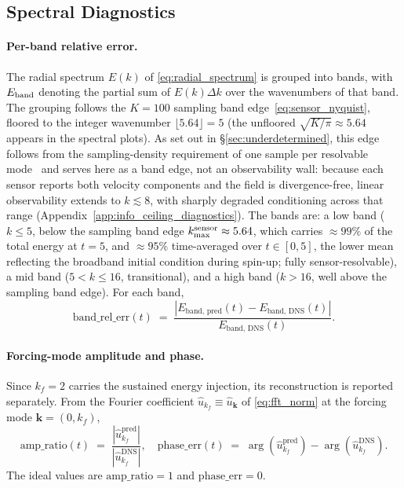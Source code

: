\subsection{Spectral Diagnostics}
\label{subsec:spectral_diagnostics}

\paragraph{Per-band relative error.}
The radial spectrum $E(k)$ of \eqref{eq:radial_spectrum} is grouped into bands, with $E_{\rm band}$ denoting the partial sum of $E(k)\Delta k$ over the wavenumbers of that band. The grouping follows the $K=100$ sampling band edge~\eqref{eq:sensor_nyquist}, floored to the integer wavenumber $\lfloor 5.64 \rfloor = 5$ (the unfloored $\sqrt{K/\pi}\approx 5.64$ appears in the spectral plots). As set out in \S\ref{sec:underdetermined}, this edge follows from the sampling-density requirement of one sample per resolvable mode~\cite{Shannon1949, Landau1967} and serves here as a band edge, not an observability wall: because each sensor reports both velocity components and the field is divergence-free, linear observability extends to $k\lesssim 8$, with sharply degraded conditioning across that range (Appendix~\ref{app:info_ceiling_diagnostics}). The bands are: a low band ($k \le 5$, below the sampling band edge $k_{\max}^{\rm sensor}\approx 5.64$, which carries $\approx 99\%$ of the total energy at $t=5$, and $\approx 95\%$ time-averaged over $t\in[0,5]$, the lower mean reflecting the broadband initial condition during spin-up; fully sensor-resolvable), a mid band ($5 < k \le 16$, transitional), and a high band ($k > 16$, well above the sampling band edge). For each band,
\begin{equation}
    \mathrm{band\_rel\_err}(t) \;=\; \frac{|E_{\text{band, pred}}(t) - E_{\text{band, DNS}}(t)|}{E_{\text{band, DNS}}(t)}.
\end{equation}

\paragraph{Forcing-mode amplitude and phase.}
Since $k_f = 2$ carries the sustained energy injection, its reconstruction is reported separately. From the Fourier coefficient $\hat{u}_{k_f} \equiv \hat{u}_{\mathbf{k}}$ of \eqref{eq:fft_norm} at the forcing mode $\mathbf{k} = (0, k_f)$,
\begin{equation}
    \mathrm{amp\_ratio}(t) \;=\; \frac{|\hat{u}^{\text{pred}}_{k_f}|}{|\hat{u}^{\text{DNS}}_{k_f}|},\quad
    \mathrm{phase\_err}(t) \;=\; \arg(\hat{u}^{\text{pred}}_{k_f}) - \arg(\hat{u}^{\text{DNS}}_{k_f}).
\end{equation}
The ideal values are $\mathrm{amp\_ratio} = 1$ and $\mathrm{phase\_err} = 0$.

